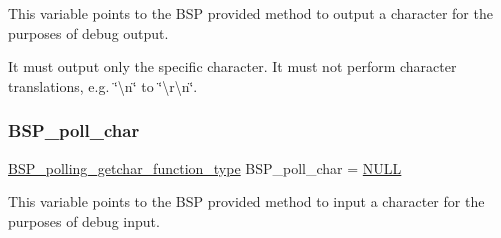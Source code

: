 This variable points to the B\+SP provided method to output a character for the purposes of debug output.

It must output only the specific character. It must not perform character translations, e.\+g. \char`\"{}\textbackslash{}n\char`\"{} to \char`\"{}\textbackslash{}r\textbackslash{}n\char`\"{}. \mbox{\label{console-debugio_8c_ae5846eecdfa8f2813504371bf01c29b0}} 
\subsubsection{\texorpdfstring{BSP\_poll\_char}{BSP\_poll\_char}}
{\footnotesize\ttfamily \mbox{\hyperlink{bspIo_8h_a132b9ceff428a634ece5dfaac7ef1006}{B\+S\+P\+\_\+polling\+\_\+getchar\+\_\+function\+\_\+type}} B\+S\+P\+\_\+poll\+\_\+char = \mbox{\hyperlink{bestcomm__api_8h_a872bb74de61c3689ccd5b41873fce42c}{N\+U\+LL}}}

This variable points to the B\+SP provided method to input a character for the purposes of debug input. 